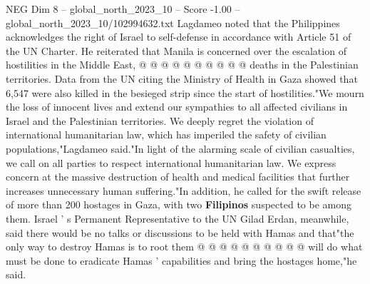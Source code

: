 \begin{textsample}{NEG Dim 8 – global\_north\_2023\_10 – Score -1.00 – global\_north\_2023\_10/102994632.txt}
Lagdameo noted that the Philippines acknowledges the right of Israel to self-defense in accordance with Article 51 of the UN Charter.
He reiterated that Manila is concerned over the escalation of hostilities in the Middle East, @ @ @ @ @ @ @ @ @ @ deaths in the Palestinian territories.
Data from the UN citing the Ministry of Health in Gaza showed that 6,547 were also killed in the besieged strip since the start of hostilities."We mourn the loss of innocent lives and extend our sympathies to all affected civilians in Israel and the Palestinian territories.
We deeply regret the violation of international humanitarian law, which has imperiled the safety of civilian populations,"Lagdameo said."In light of the alarming scale of civilian casualties, we call on all parties to respect international humanitarian law.
We express concern at the massive destruction of health and medical facilities that further increases unnecessary human suffering."In addition, he called for the swift release of more than 200 hostages in Gaza, with two \textbf{Filipinos} suspected to be among them.
Israel ' s Permanent Representative to the UN Gilad Erdan, meanwhile, said there would be no talks or discussions to be held with Hamas and that"the only way to destroy Hamas is to root them @ @ @ @ @ @ @ @ @ @ will do what must be done to eradicate Hamas ' capabilities and bring the hostages home,"he said.

\end{textsample}
